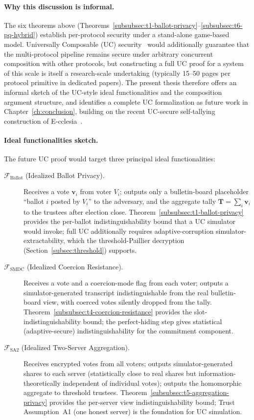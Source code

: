 \paragraph{Why this discussion is informal.} The six theorems above (Theorems~\ref{subsubsec:t1-ballot-privacy}--\ref{subsubsec:t6-pq-hybrid}) establish per-protocol security under a stand-alone game-based model. Universally Composable (UC) security~\cite{canetti2001uc} would additionally guarantee that the multi-protocol pipeline remains secure under arbitrary concurrent composition with other protocols, but constructing a full UC proof for a system of this scale is itself a research-scale undertaking (typically 15--50 pages per protocol primitive in dedicated papers). The present thesis therefore offers an informal sketch of the UC-style ideal functionalities and the composition argument structure, and identifies a complete UC formalization as future work in Chapter~\ref{ch:conclusion}, building on the recent UC-secure self-tallying construction of E-cclesia~\cite{ecclesia2025}.

\paragraph{Ideal functionalities sketch.} The future UC proof would target three principal ideal functionalities:
\begin{description}
    \item[$\mathcal{F}_{\mathrm{Ballot}}$ (Idealized Ballot Privacy).] Receives a vote $\mathbf{v}_i$ from voter $V_i$; outputs only a bulletin-board placeholder ``ballot $i$ posted by $V_i$'' to the adversary, and the aggregate tally $\mathbf{T} = \sum_i \mathbf{v}_i$ to the trustees after election close. Theorem~\ref{subsubsec:t1-ballot-privacy} provides the per-ballot indistinguishability bound that a UC simulator would invoke; full UC additionally requires adaptive-corruption simulator-extractability, which the threshold-Paillier decryption (Section~\ref{subsec:threshold}) supports.
    \item[$\mathcal{F}_{\mathrm{SMDC}}$ (Idealized Coercion Resistance).] Receives a vote and a coercion-mode flag from each voter; outputs a simulator-generated transcript indistinguishable from the real bulletin-board view, with coerced votes silently dropped from the tally. Theorem~\ref{subsubsec:t4-coercion-resistance} provides the slot-indistinguishability bound; the perfect-hiding step gives statistical (adaptive-secure) indistinguishability for the commitment component.
    \item[$\mathcal{F}_{\mathrm{SA2}}$ (Idealized Two-Server Aggregation).] Receives encrypted votes from all voters; outputs simulator-generated shares to each server (statistically close to real shares but information-theoretically independent of individual votes); outputs the homomorphic aggregate to threshold trustees. Theorem~\ref{subsubsec:t5-aggregation-privacy} provides the per-server view indistinguishability bound; Trust Assumption~A1 (one honest server) is the foundation for UC simulation.
\end{description}

